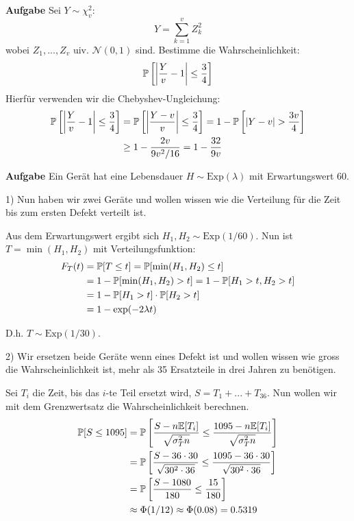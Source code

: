 \hrulefill

\textbf{Aufgabe}
Sei $Y \sim \chi_v^2$:
$$Y = \sum_{k = 1}^v Z_k^2$$
wobei $Z_1,...,Z_v$ uiv. $\mathcal{N}(0,1)$ sind. Bestimme die Wahrscheinlichkeit:
$$\mathbb{P} \left[ \left| \frac{Y}{v} - 1\right| \leq \frac{3}{4}\right]$$
Hierfür verwenden wir die Chebyshev-Ungleichung:
\begin{align*}
	\mathbb{P} \left[ \left| \frac{Y}{v} - 1\right| \leq \frac{3}{4}\right] &= \mathbb{P} \left[ \left| \frac{Y - v}{v}\right| \leq \frac{3}{4}\right] = 1 - \mathbb{P} \left[ \left| Y - v \right| > \frac{3v}{4} \right] \\
	&\geq 1 - \frac{2v}{9v^2 / 16} = 1 - \frac{32}{9v} 
\end{align*}

\hrulefill

\textbf{Aufgabe}
Ein Gerät hat eine Lebensdauer $H \sim \text{Exp}(\lambda)$ mit Erwartungswert 60. \smallskip

1) Nun haben wir zwei Geräte und wollen wissen wie die Verteilung für die Zeit bis zum ersten Defekt verteilt ist. 

Aus dem Erwartungswert ergibt sich $H_1, H_2 \sim \text{Exp}(1 / 60)$. Nun ist $T = \min (H_1, H_2)$ mit Verteilungsfunktion:
\begin{align*}
	F_T(t) &= \mathbb{P}[T \leq t] = \mathbb{P}[\min (H_1, H_2) \leq t] \\
	&= 1 - \mathbb{P}[\min (H_1, H_2) > t] = 1 - \mathbb{P}[H_1 > t, H_2 > t] \\
	&= 1 - \mathbb{P}[H_1 > t] \cdot \mathbb{P}[H_2 > t] \\
	&= 1 - \exp(-2 \lambda t)
\end{align*}

D.h. $T \sim \text{Exp}(1/30)$.

\smallskip

2) Wir ersetzen beide Geräte wenn eines Defekt ist und wollen wissen wie gross die Wahrscheinlichkeit ist, mehr als 35 Ersatzteile in drei Jahren zu benötigen.

Sei $T_i$ die Zeit, bis das $i$-te Teil ersetzt wird, $S = T_1 + ... + T_{36}$. Nun wollen wir mit dem Grenzwertsatz die Wahrscheinlichkeit berechnen.
\begin{align*}
	\mathbb{P}[S \leq 1095] &= \mathbb{P} \left[ \frac{S - n \mathbb{E}[T_i]}{\sqrt{\sigma_T^2 n}} \leq \frac{1095 - n \mathbb{E}[T_i]}{\sqrt{\sigma_T^2 n}}\right] \\
	&= \mathbb{P} \left[ \frac{S - 36 \cdot 30}{\sqrt{30^2 \cdot 36}} \leq \frac{1095 - 36 \cdot 30}{\sqrt{30^2 \cdot 36}} \right] \\
	&= \mathbb{P} \left[ \frac{S - 1080}{180} \leq \frac{15}{180} \right] \\
	&\approx \Phi(1/12) \approx \Phi(0.08) = 0.5319
\end{align*}

